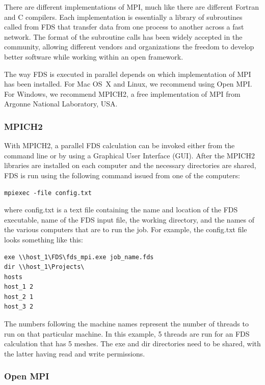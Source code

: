 \documentclass[11pt]{book}
\begin{document}
There are different implementations of MPI, much like there
are different Fortran and C compilers. Each implementation is
essentially a library of subroutines called from FDS that transfer
data from one process to another across a fast network. The format of
the subroutine calls has been widely accepted in the community,
allowing different vendors and organizations the freedom to develop
better software while working within an open framework.

The way FDS is executed in parallel depends on which implementation of MPI has been installed.  For Mac OS~X and Linux, we recommend using Open MPI. For Windows, we recommend MPICH2, a free implementation of MPI from Argonne National Laboratory, USA.

\subsubsection{MPICH2}

With MPICH2, a parallel FDS calculation can be invoked either
from the command line or by using a Graphical User Interface
(GUI). After the MPICH2 libraries are installed on each computer and
the necessary directories are shared, FDS is run using the following command
issued from one of the computers:
\begin{lstlisting}
mpiexec -file config.txt
\end{lstlisting}
where {\ct config.txt} is a text file containing the name and location
of the FDS executable, name of the FDS input file, the working directory,
and the names of the various computers that are to run the job. For
example, the {\ct config.txt} file looks something like this:
\begin{lstlisting}
exe \\host_1\FDS\fds_mpi.exe job_name.fds
dir \\host_1\Projects\
hosts
host_1 2
host_2 1
host_3 2
\end{lstlisting}
The numbers following the machine names represent the number of threads to run on that particular machine. In this
example, 5 threads are run for an FDS calculation that has 5 meshes. The {\ct exe} and {\ct dir} directories need to be shared, with the
latter having read and write permissions.


\subsubsection{Open MPI}
\end{document}
